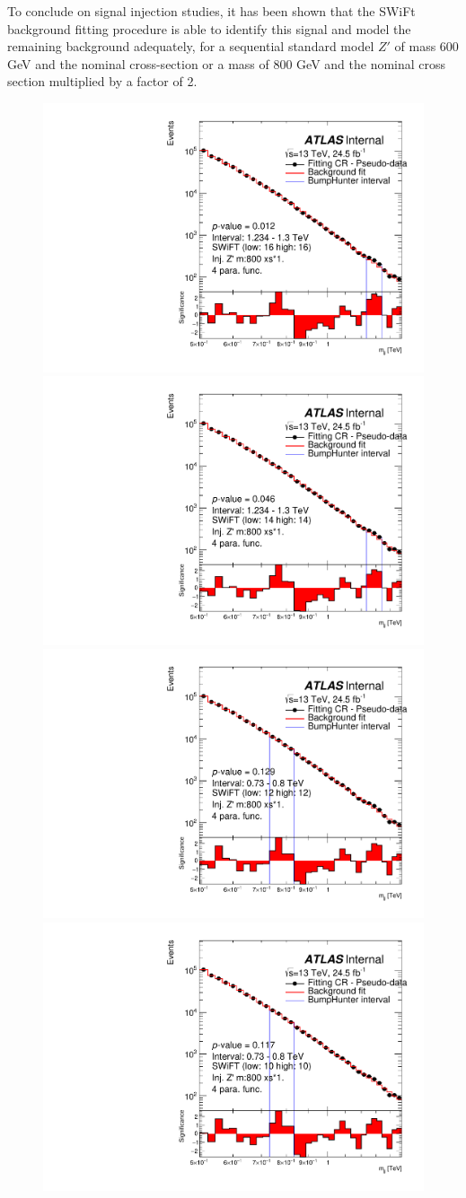 To conclude on signal injection studies, it has been shown that the SWiFt background fitting procedure is able to identify this signal and model the remaining background adequately,
for a sequential standard model $Z'$ of mass 600 GeV and the nominal cross-section or a mass of 800 GeV and the nominal cross section multiplied by a factor of 2.

\begin{figure}[!htb]
\captionsetup[subfigure]{aboveskip=0pt,justification=centering}
\centering
{} {
  \includegraphics[width=0.3\linewidth, angle=0]{figs/Dibjet/LowMass/FitStudy/bhFit_corrFitCR_dataLike_4para_low16_high16_inj_Zprimebb800_xsFactor1.pdf}
}
 {
  \includegraphics[width=0.3\linewidth, angle=0]{figs/Dibjet/LowMass/FitStudy/bhFit_corrFitCR_dataLike_4para_low14_high14_inj_Zprimebb800_xsFactor1.pdf}
}
 {
  \includegraphics[width=0.3\linewidth, angle=0]{figs/Dibjet/LowMass/FitStudy/bhFit_corrFitCR_dataLike_4para_low12_high12_inj_Zprimebb800_xsFactor1.pdf}
}\\
 {
  \includegraphics[width=0.3\linewidth, angle=0]{figs/Dibjet/LowMass/FitStudy/bhFit_corrFitCR_dataLike_4para_low10_high10_inj_Zprimebb800_xsFactor1.pdf}
}
\end{figure}
